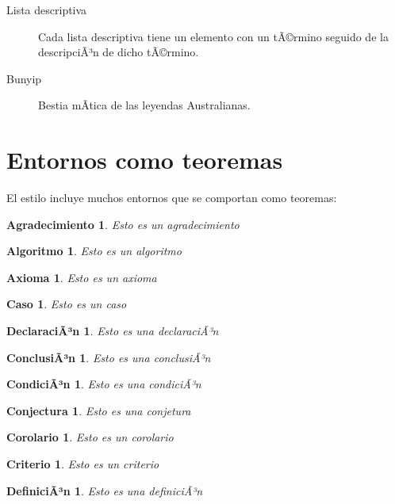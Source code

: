 \documentclass[11pt,spanish]{report}
\newtheorem{acknowledgement}{Agradecimiento}[section]
\newtheorem{algorithm}{Algoritmo}[section]
\newtheorem{axiom}{Axioma}[section]
\newtheorem{case}{Caso}[section]
\newtheorem{claim}{DeclaraciÃ³n}[section]
\newtheorem{conclusion}{ConclusiÃ³n}[section]
\newtheorem{condition}{CondiciÃ³n}[section]
\newtheorem{conjecture}{Conjectura}[section]
\newtheorem{corollary}{Corolario}[section]
\newtheorem{criterion}{Criterio}[section]
\newtheorem{definition}{DefiniciÃ³n}[section]
\begin{document}
\begin{description}
\item[Lista descriptiva] Cada lista descriptiva tiene un elemento con un tÃ©rmino seguido de la descripciÃ³n de dicho tÃ©rmino.

\item[Bunyip] Bestia mÃ­tica de las leyendas Australianas.
\end{description}

\section{Entornos como teoremas}

El estilo incluye muchos entornos que se comportan como teoremas:

\begin{acknowledgement}
Esto es un agradecimiento
\end{acknowledgement}

\begin{algorithm}
Esto es un algoritmo
\end{algorithm}

\begin{axiom}
Esto es un axioma
\end{axiom}

\begin{case}
Esto es un caso
\end{case}

\begin{claim}
Esto es una declaraciÃ³n
\end{claim}

\begin{conclusion}
Esto es una conclusiÃ³n
\end{conclusion}

\begin{condition}
Esto es una condiciÃ³n
\end{condition}

\begin{conjecture}
Esto es una conjetura
\end{conjecture}

\begin{corollary}
Esto es un corolario
\end{corollary}

\begin{criterion}
Esto es un criterio
\end{criterion}

\begin{definition}
Esto es una definiciÃ³n
\end{definition}
\end{document}
